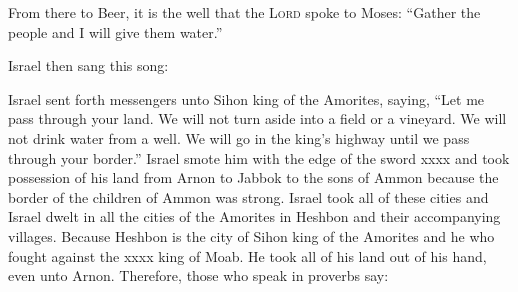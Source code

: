 \begin{inparaenum}
    
    
    \noindent{} From there to Beer, it is the well that the \textsc{Lord} spoke to Moses: ``Gather the people and I will give them water.''%
    
     Israel then sang this song:\smallskip%
    
    
    
    \pvdb{}{}%
    
    \noindent{} %
    
     Israel sent forth messengers unto Sihon king of the Amorites, saying,%
     ``Let me pass through your land. We will not turn aside into a field or a vineyard. We will not drink water from a well. We will go in the king's highway until we pass through your border.''%
     Israel smote him with the edge of the sword xxxx and took possession of his land from Arnon to Jabbok to the sons of Ammon because the border of the children of Ammon was strong.%
     Israel took all of these cities and Israel dwelt in all the cities of the Amorites in Heshbon and their accompanying villages.%
     Because Heshbon is the city of Sihon king of the Amorites and he who fought against the xxxx king of Moab. He took all of his land out of his hand, even unto Arnon.%
     Therefore, those who speak in proverbs say:\smallskip%
    

\end{inparaenum}
